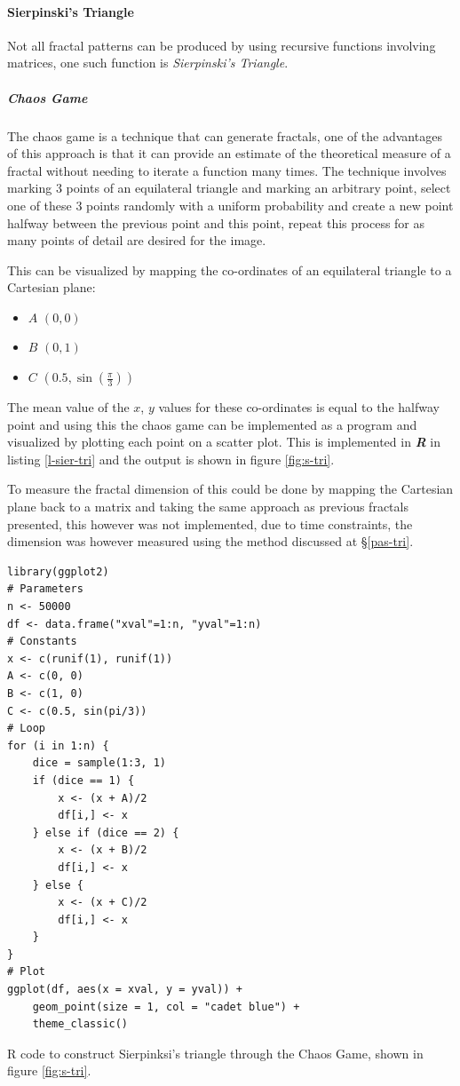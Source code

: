 \documentclass[a4paper,11pt,twoside]{article}
\begin{document}
\paragraph{Sierpinski's Triangle}
\label{sec:orge0f953f}
Not all fractal patterns can be produced by using recursive functions involving matrices, one such function is \emph{Sierpinski's Triangle}.
\subparagraph{Chaos Game}
\label{sec:org20c8507}
The chaos game is a technique that can generate fractals, one of the advantages of this approach is that it can provide an estimate of the theoretical measure of a fractal without needing to iterate a function many times. The technique involves marking 3 points of an equilateral triangle and marking an arbitrary point, select one of these 3 points randomly with a uniform probability and create a new point halfway between the previous point and this point, repeat this process for as many points of detail are desired for the image.

This can be visualized by mapping the co-ordinates of an equilateral triangle to a Cartesian plane:

\begin{itemize}
\item \(A\)  \(\left(0, 0\right)\)
\item \(B\)  \(\left(0, 1\right)\)
\item \(C\)  \(\left(0.5, \sin\left(\frac{\pi}{3}\right)\right)\)
\end{itemize}

The mean value of the \(x\), \(y\) values for these co-ordinates is equal to the
halfway point and using this the chaos game can be implemented as a program and
visualized by plotting each point on a scatter plot. This is implemented in
\emph{\textbf{R}} in listing \ref{l-sier-tri} and the output is shown in figure \ref{fig:s-tri}.

To measure the fractal dimension of this could be done by mapping the Cartesian
plane back to a matrix and taking the same approach as previous fractals
presented, this however was not implemented, due to time constraints, the
dimension was however measured using the method discussed at \S \ref{pas-tri}.

\begin{listing}[htbp]
\begin{verbatim}
library(ggplot2)
# Parameters
n <- 50000
df <- data.frame("xval"=1:n, "yval"=1:n)
# Constants
x <- c(runif(1), runif(1))
A <- c(0, 0)
B <- c(1, 0)
C <- c(0.5, sin(pi/3))
# Loop
for (i in 1:n) {
    dice = sample(1:3, 1)
    if (dice == 1) {
        x <- (x + A)/2
        df[i,] <- x
    } else if (dice == 2) {
        x <- (x + B)/2
        df[i,] <- x
    } else {
        x <- (x + C)/2
        df[i,] <- x
    }
}
# Plot
ggplot(df, aes(x = xval, y = yval)) +
    geom_point(size = 1, col = "cadet blue") +
    theme_classic()

\end{verbatim}
\caption{\label{l-sier-tri}R code to construct Sierpinksi's triangle through the Chaos Game, shown in figure \ref{fig:s-tri}.}
\end{listing}
\end{document}
